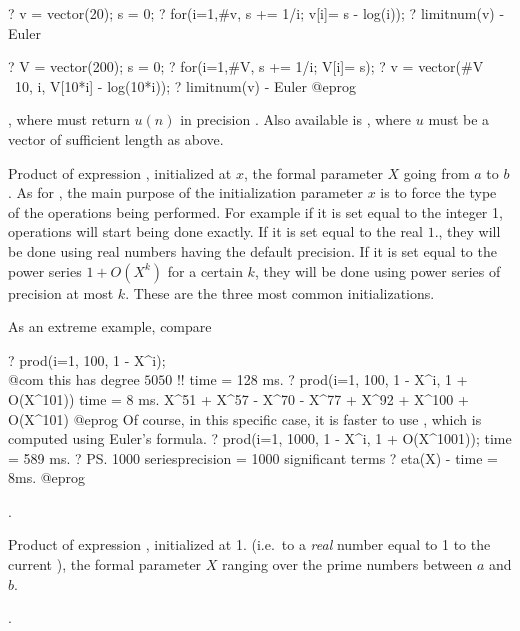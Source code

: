 ? v = vector(20); s = 0;
? for(i=1,#v, s += 1/i; v[i]= s - log(i));
? limitnum(v) - Euler

? V = vector(200); s = 0;
? for(i=1,#V, s += 1/i; V[i]= s);
? v = vector(#V \ 10, i, V[10*i] - log(10*i));
? limitnum(v) - Euler
@eprog

, where  must return $u(n)$ in precision .
Also available is
, where $u$
must be a vector of sufficient length as above.

\label{se:prod}
Product of expression
, initialized at $x$, the formal parameter $X$ going from $a$ to
$b$. As for , the main purpose of the initialization parameter $x$
is to force the type of the operations being performed. For example if it is
set equal to the integer 1, operations will start being done exactly. If it
is set equal to the real $1.$, they will be done using real numbers having
the default precision. If it is set equal to the power series $1+O(X^k)$ for
a certain $k$, they will be done using power series of precision at most $k$.
These are the three most common initializations.

\noindent As an extreme example, compare

\bprog
? prod(i=1, 100, 1 - X^i);  \\@com this has degree $5050$ !!
time = 128 ms.
? prod(i=1, 100, 1 - X^i, 1 + O(X^101))
time = 8 ms.
X^51 + X^57 - X^70 - X^77 + X^92 + X^100 + O(X^101)
@eprog\noindent
Of course, in  this specific case, it is faster to use ,
which is computed using Euler's formula.
\bprog
? prod(i=1, 1000, 1 - X^i, 1 + O(X^1001));
time = 589 ms.
? \ps1000
seriesprecision = 1000 significant terms
? eta(X) - %
time = 8ms.
@eprog

.

\label{se:prodeuler}
Product of expression ,
initialized at 1. (i.e.~to a \emph{real} number equal to 1 to the current
), the formal parameter $X$ ranging over the prime numbers
between $a$ and $b$.

.

